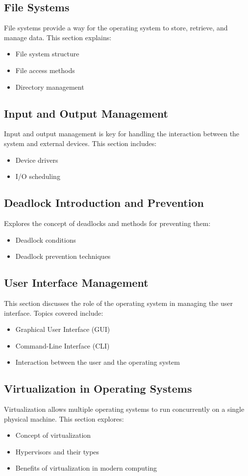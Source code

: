 \documentclass[12pt]{article}
\begin{document}
	\subsection{File Systems}
	File systems provide a way for the operating system to store, retrieve, and manage data. This section explains:
	\begin{itemize}
		\item File system structure
		\item File access methods
		\item Directory management
	\end{itemize}
	
	\subsection{Input and Output Management}
	Input and output management is key for handling the interaction between the system and external devices. This section includes:
	\begin{itemize}
		\item Device drivers
		\item I/O scheduling
	\end{itemize}
	
	\subsection{Deadlock Introduction and Prevention}
	Explores the concept of deadlocks and methods for preventing them:
	\begin{itemize}
		\item Deadlock conditions
		\item Deadlock prevention techniques
	\end{itemize}
	
	\subsection{User Interface Management}
	This section discusses the role of the operating system in managing the user interface. Topics covered include:
	\begin{itemize}
		\item Graphical User Interface (GUI)
		\item Command-Line Interface (CLI)
		\item Interaction between the user and the operating system
	\end{itemize}
	
	\subsection{Virtualization in Operating Systems}
	Virtualization allows multiple operating systems to run concurrently on a single physical machine. This section explores:
	\begin{itemize}
		\item Concept of virtualization
		\item Hypervisors and their types
		\item Benefits of virtualization in modern computing
	\end{itemize}
	
\end{document}
